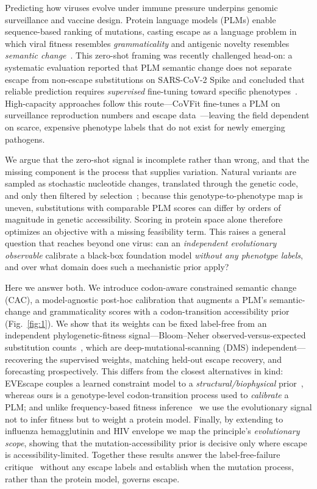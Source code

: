 \documentclass[11pt]{article}
\begin{document}
Predicting how viruses evolve under immune pressure underpins genomic surveillance and vaccine design. Protein language models (PLMs) enable sequence-based ranking of mutations, casting escape as a language problem in which viral fitness resembles \emph{grammaticality} and antigenic novelty resembles \emph{semantic change}~\cite{hie2021learning,lin2023evolutionary}. This zero-shot framing was recently challenged head-on: a systematic evaluation reported that PLM semantic change does not separate escape from non-escape substitutions on SARS-CoV-2 Spike and concluded that reliable prediction requires \emph{supervised} fine-tuning toward specific phenotypes~\cite{allman2025systematic}. High-capacity approaches follow this route---CoVFit fine-tunes a PLM on surveillance reproduction numbers and escape data~\cite{covfit2025}---leaving the field dependent on scarce, expensive phenotype labels that do not exist for newly emerging pathogens.

We argue that the zero-shot signal is incomplete rather than wrong, and that the missing component is the process that supplies variation. Natural variants are sampled as stochastic nucleotide changes, translated through the genetic code, and only then filtered by selection~\cite{Halpern1998,Rodrigue2010}; because this genotype-to-phenotype map is uneven, substitutions with comparable PLM scores can differ by orders of magnitude in genetic accessibility. Scoring in protein space alone therefore optimizes an objective with a missing feasibility term. This raises a general question that reaches beyond one virus: can an \emph{independent evolutionary observable} calibrate a black-box foundation model \emph{without any phenotype labels}, and over what domain does such a mechanistic prior apply?

Here we answer both. We introduce codon-aware constrained semantic change (CAC), a model-agnostic post-hoc calibration that augments a PLM's semantic-change and grammaticality scores with a codon-transition accessibility prior (Fig.~\ref{fig:1}). We show that its weights can be fixed label-free from an independent phylogenetic-fitness signal---Bloom--Neher observed-versus-expected substitution counts~\cite{bloom2023fitness}, which are deep-mutational-scanning (DMS) independent---recovering the supervised weights, matching held-out escape recovery, and forecasting prospectively. This differs from the closest alternatives in kind: EVEscape couples a learned constraint model to a \emph{structural/biophysical} prior~\cite{thadani2023evescape}, whereas ours is a genotype-level codon-transition process used to \emph{calibrate} a PLM; and unlike frequency-based fitness inference~\cite{obermeyer2022analysis} we use the evolutionary signal not to infer fitness but to weight a protein model. Finally, by extending to influenza hemagglutinin and HIV envelope we map the principle's \emph{evolutionary scope}, showing that the mutation-accessibility prior is decisive only where escape is accessibility-limited. Together these results answer the label-free-failure critique~\cite{allman2025systematic} without any escape labels and establish when the mutation process, rather than the protein model, governs escape.
\end{document}
